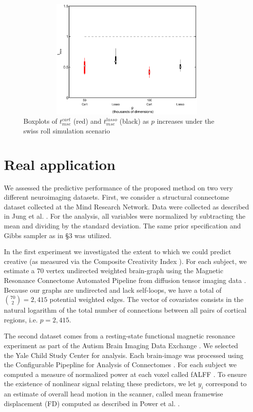 \documentclass{article} %
\begin{document}
\begin{figure}
\centering
\includegraphics[width=120mm,height=60mm]{box_exp3.eps} 
\caption{Boxplots of  $t^{cart}_{mse}$ (red) and $t^{lasso}_{mse}$ (black) as $p$ increases under the swiss roll simulation scenario} \label{swiss:plot}
\end{figure}



\section{Real application}

We assessed the predictive performance of the proposed method on two very different neuroimaging datasets. First, we consider a structural connectome dataset collected at the Mind Research Network.  Data were collected as described in Jung et al. \cite{Jung2010}. For the analysis, all variables were normalized by subtracting the mean and dividing by the standard deviation. The same prior specification and Gibbs sampler as in \S 3 was  utilized. 

In the first experiment we investigated the extent to which we could predict creative (as measured via the Composite Creativity Index \cite{Arden2010}).   For each subject, we estimate a $70$ vertex undirected weighted brain-graph using the Magnetic Resonance Connectome Automated Pipeline \cite{MRCAP11} from diffusion tensor imaging data \cite{Mori2006}. Because our graphs are undirected and lack self-loops, we have a total of $\binom{70}{2}=2,415$ potential weighted edges. The vector of covariates consists in the natural logarithm of the total number of connections between all pairs of cortical regions, i.e. $p=2,415$. 

The second dataset comes from a resting-state functional magnetic resonance experiment as part of the Autism Brain Imaging Data Exchange \cite{Autism}.  We selected the Yale Child Study Center for analysis.  Each brain-image was processed using the Configurable Pipepline for Analysis of Connectomes \cite{cpac}. For each subject we computed a measure of normalized power at each voxel called fALFF \cite{Zou2008}.  To ensure the existence of nonlinear signal relating these predictors, we let $y_i$ correspond to an estimate of overall head motion in the scanner, called mean framewise displacement (FD) computed as described in Power et al. \cite{power}. 
\end{document}
